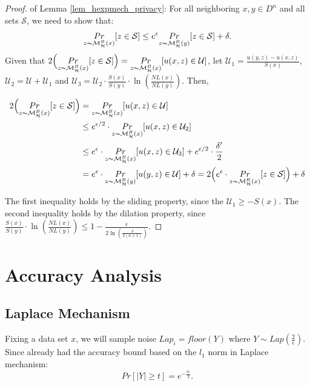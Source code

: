 \documentclass[sigconf, anonymous]{acmart}
\begin{document}
\begin{proof}
of Lemma \ref{lem_hexpmech_privacy}: For all neighboring $x, y \in D^n$ and all sets $\mathcal{S}$, we need to show that:
\begin{equation*}
\underset{z \thicksim \mathcal{M}^{B}_{\mathcal{H}}(x)}{Pr}[ z \in \mathcal{S}] \leq e^{\epsilon} \underset{z \thicksim \mathcal{M}^{B}_{\mathcal{H}}(y)}{Pr}[z \in \mathcal{S}] + \delta. 
\end{equation*}
Given that $2\Big( \underset{z \thicksim \mathcal{M}^{B}_{\mathcal{H}}(x)}{Pr}[ z \in \mathcal{S}]\Big) = \underset{z \thicksim \mathcal{M}^{B}_{\mathcal{H}}(x)}{Pr}[ u(x,z) \in \mathcal{U}]$, let $\mathcal{U}_1 = \frac{u(y,z) - u(x,z)}{S(x)}$, $\mathcal{U}_2 = \mathcal{U} + \mathcal{U}_1$ and $\mathcal{U}_3 = \mathcal{U}_2 \cdot \frac{S(x)}{S(y)} \cdot \ln(\frac{NL(x)}{NL(y)})$. Then,

\begin{equation*}
\begin{split}
2\Big( \underset{z \thicksim \mathcal{M}^{B}_{\mathcal{H}}(x)}{Pr}[ z \in \mathcal{S}]\Big)
& = \underset{z \thicksim \mathcal{M}^{B}_{\mathcal{H}}(x)}{Pr}[ u(x,z) \in \mathcal{U}]\\
& \leq e^{\epsilon / 2} \cdot \underset{z \thicksim \mathcal{M}^{B}_{\mathcal{H}}(x)}{Pr}[ u(x,z) \in \mathcal{U}_2]\\
& \leq e^{\epsilon} \cdot \underset{z \thicksim \mathcal{M}^{B}_{\mathcal{H}}(x)}{Pr}[ u(x,z) \in \mathcal{U}_3] + e^{\epsilon/2} \cdot \frac{\delta'}{2}\\
& = e^{\epsilon} \cdot \underset{z \thicksim \mathcal{M}^{B}_{\mathcal{H}}(y)}{Pr}[ u(y,z) \in \mathcal{U}] + \delta = 2\Big( e^{\epsilon} \cdot \underset{z \thicksim \mathcal{M}^{B}_{\mathcal{H}}(x)}{Pr}[ z \in \mathcal{S}] \Big) + \delta\\
\end{split}
\end{equation*}

The first inequality holds by the sliding property, since the $\mathcal{U}_1 \geq -S(x)$. The second inequality holds by the dilation property, since $\frac{S(x)}{S(y)} \cdot \ln(\frac{NL(x)}{NL(y)}) \leq 1 - \frac{\epsilon}{2 \ln (\frac{\delta}{2 (n + 1)})}$.

\end{proof}

\section{Accuracy Analysis}
\subsection{Laplace Mechanism}
\label{subsec_accuracy_lap}
Fixing a data set $x$, we will sample noise $Lap_i = floor(Y)$ where $Y \sim Lap(\frac{2}{\epsilon})$. Since already had the accuracy bound based on the $l_1$ norm in Laplace mechanism:
\begin{equation*}
Pr[|Y| \geq t] = e^{- \frac{t \epsilon}{2}}.
\end{equation*}
\end{document}
